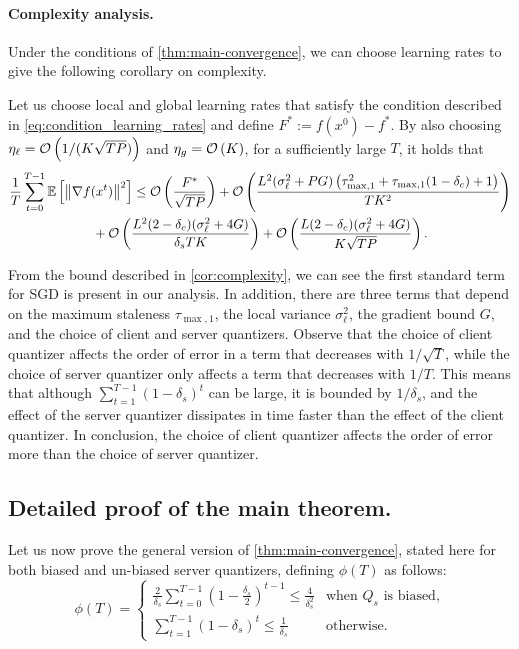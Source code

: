 \paragraph{Complexity analysis.}
Under the conditions of \cref{thm:main-convergence}, we can choose learning rates to give the following corollary on complexity.
\begin{corollary} \label{cor:complexity}
    Let us choose local and global learning rates that satisfy the condition described in \eqref{eq:condition_learning_rates} and define $F^* := f(x^0) - f^*$.
    By also choosing $\eta_\ell = \mathcal{O}\left(1 / (K\sqrt{TP})\right)$ and $\eta_g = \mathcal{O}\left(K\right)$, for a sufficiently large $T$, it holds that
    \begin{multline} \label{eq:conv_rate}
        \frac{1}{T} \sum_{t=0}^{T-1} \mathbb{E}\left[\left\lVert\nabla f(x^t)\right\rVert^2\right] \leq \mathcal{O}\left(\frac{F^*}{\sqrt{TP}}\right) + \mathcal{O}\left(\frac{L^2 (\sigma_{\ell}^2 + PG) \left( \tau_{\max, 1}^2 + \tau_{\max, 1}(1-\delta_c) + 1\right)}{TK^2} \right) \\
        {} +  \mathcal{O}\left(\frac{L^2 (2-\delta_c)(\sigma_\ell^2 + 4G)}{\delta_sTK} \right) + \mathcal{O}\left( \frac{L(2-\delta_c)(\sigma_{\ell}^2 + 4G)}{K\sqrt{TP}} \right) .
    \end{multline}
\end{corollary}
From the bound described in \cref{cor:complexity}, we can see the first standard term for SGD is present in our analysis.
In addition, there are three terms that depend on the maximum staleness $\tau_{\max,1}$, the local variance $\sigma_{\ell}^2$, the gradient bound $G$, and the choice of client and server quantizers.
Observe that the choice of client quantizer affects the order of error in a term that decreases with $1/\sqrt{T}$, while the choice of server quantizer only affects a term that decreases with $1/T$.
This means that although $\sum_{t=1}^{T-1} (1-\delta_s)^t $ can be large, it is bounded by $1/\delta_s$, and the effect of the server quantizer dissipates in time faster than the effect of the client quantizer.
In conclusion, the choice of client quantizer affects the order of error more than the choice of server quantizer.




\subsection{Detailed proof of the main theorem.}
Let us now prove the general version of \cref{thm:main-convergence}, stated here for both biased and un-biased server quantizers, defining $\phi(T)$ as follows:
\begin{equation} \label{eq:phi}
    \phi(T) =
    \begin{cases}
        \frac{2}{\delta_s}\sum_{t=0}^{T-1} (1-\tfrac{\delta_s}{2})^{t-1} \leq \frac{4}{\delta_s^2} & \text{when $Q_s$ is biased,} \\
        \sum_{t=1}^{T-1} (1-\delta_s)^t \leq \frac{1}{\delta_s}                                    & \text{otherwise.}
    \end{cases}
\end{equation}

